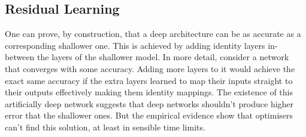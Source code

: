 \documentclass[11pt]{report}
\begin{document}
    \subsection{Residual Learning}
    One can prove, by construction, that a deep architecture can be as accurate as a corresponding shallower one.
    This is achieved by adding identity layers in-between the layers of the shallower model.
    In more detail, consider a network that converges with some accuracy.
    Adding more layers to it would achieve the exact same accuracy if the extra layers learned to map their inputs straight to their outputs effectively making them identity mappings.
    The existence of this artificially deep network suggests that deep networks shouldn't produce higher error that the shallower ones.
    But the empirical evidence show that optimisers can't find this solution, at least in sensible time limits.
\end{document}

